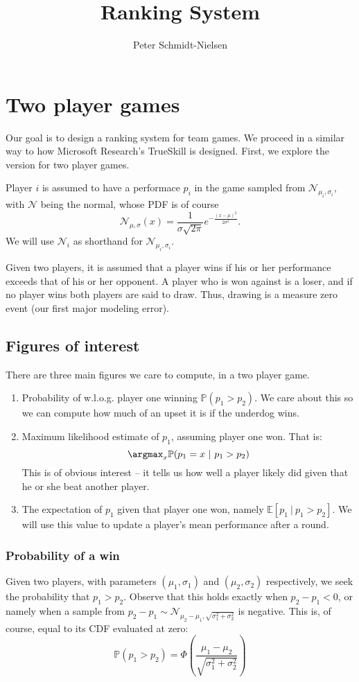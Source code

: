\documentclass[12pt]{article}
\title{Ranking System}
\author{Peter Schmidt-Nielsen}
\begin{document}
\maketitle

\section{Two player games}
Our goal is to design a ranking system for team games.
We proceed in a similar way to how Microsoft Research's TrueSkill is designed.
First, we explore the version for two player games.

Player $i$ is assumed to have a performace $p_i$ in the game sampled from $\mathcal{N}_{\mu_i, \sigma_i}$, with
$\mathcal{N}$ being the normal, whose PDF is of course
\[ \mathcal{N}_{\mu, \sigma}(x) = \frac1{\sigma \sqrt{2 \pi}} e^{-\frac{(x-\mu)^2}{2\sigma^2}}. \]
We will use $\mathcal{N}_i$ as shorthand for $\mathcal{N}_{\mu_i, \sigma_i}$.

Given two players, it is assumed that a player wins if his or her performance exceeds that of his or her opponent.
A player who is won against is a loser, and if no player wins both players are said to draw.
Thus, drawing is a measure zero event (our first major modeling error).

\subsection{Figures of interest}
There are three main figures we care to compute, in a two player game.
\begin{enumerate}
\item
	Probability of w.l.o.g. player one winning $\mathbb{P}(p_1 > p_2)$.
	We care about this so we can compute how much of an upset it is if the underdog wins.
\item
	Maximum likelihood estimate of $p_1$, assuming player one won.
	That is:
	\[ \argmax_{x} \mathbb{P}(p_1 = x\ |\ p_1 > p_2) \]
	This is of obvious interest -- it tells us how well a player likely did given that he or she beat another player.
\item
	The expectation of $p_1$ given that player one won, namely $\mathbb{E}[p_1\ |\ p_1 > p_2]$.
	We will use this value to update a player's mean performance after a round.
\end{enumerate}

\subsubsection{Probability of a win}
Given two players, with parameters $(\mu_1, \sigma_1)$ and $(\mu_2, \sigma_2)$ respectively, we seek the probability that $p_1 > p_2$.
Observe that this holds exactly when $p_2 - p_1 < 0$, or namely when a sample from $p_2 - p_1 \sim \mathcal{N}_{\mu_2 - \mu_1,\sqrt{\sigma_1^2 + \sigma_2^2}}$ is negative.
This is, of course, equal to its CDF evaluated at zero:
\[ \mathbb{P}(p_1 > p_2) = \Phi\left(\frac{\mu_1 - \mu_2}{\sqrt{\sigma_1^2 + \sigma_2^2}}\right) \]
\end{document}
